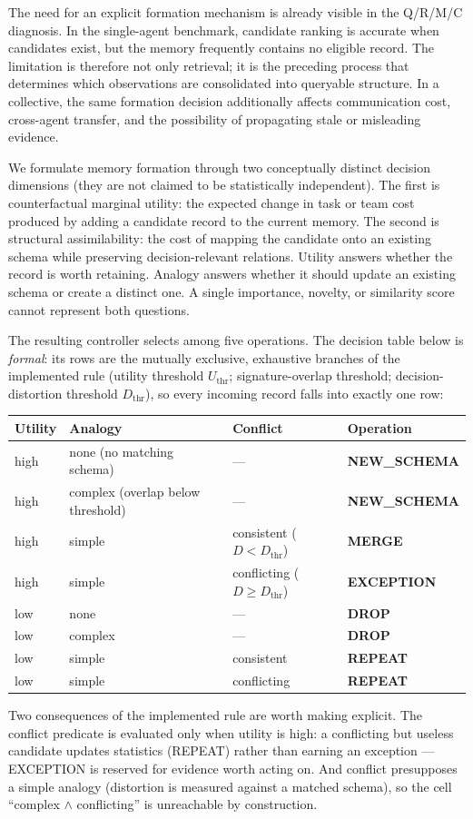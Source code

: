 \documentclass{article}
\begin{document}
The need for an explicit formation mechanism is already visible in the
Q/R/M/C diagnosis. In the single-agent benchmark, candidate ranking is
accurate when candidates exist, but the memory frequently contains no
eligible record. The limitation is therefore not only retrieval; it
is the preceding process that determines which observations are
consolidated into queryable structure. In a collective, the same
formation decision additionally affects communication cost,
cross-agent transfer, and the possibility of propagating stale or
misleading evidence.

We formulate memory formation through two conceptually distinct decision dimensions (they are not claimed to be statistically independent). The first
is counterfactual marginal utility: the expected change in task or
team cost produced by adding a candidate record to the current memory.
The second is structural assimilability: the cost of mapping the
candidate onto an existing schema while preserving decision-relevant
relations. Utility answers whether the record is worth retaining.
Analogy answers whether it should update an existing schema or create
a distinct one. A single importance, novelty, or similarity score
cannot represent both questions.

The resulting controller selects among five operations. The decision
table below is \emph{formal}: its rows are the mutually exclusive,
exhaustive branches of the implemented rule (utility threshold
$U_{\mathrm{thr}}$; signature-overlap threshold; decision-distortion
threshold $D_{\mathrm{thr}}$), so every incoming record falls into
exactly one row:
\begin{center}
\small
\begin{tabular}{llll}
\toprule
Utility & Analogy & Conflict & Operation \\
\midrule
high & none (no matching schema) & --- & \textbf{NEW\_SCHEMA} \\
high & complex (overlap below threshold) & --- & \textbf{NEW\_SCHEMA} \\
high & simple & consistent ($D{<}D_{\mathrm{thr}}$) & \textbf{MERGE} \\
high & simple & conflicting ($D{\ge}D_{\mathrm{thr}}$) & \textbf{EXCEPTION} \\
low & none & --- & \textbf{DROP} \\
low & complex & --- & \textbf{DROP} \\
low & simple & consistent & \textbf{REPEAT} \\
low & simple & conflicting & \textbf{REPEAT} \\
\bottomrule
\end{tabular}
\end{center}
Two consequences of the implemented rule are worth making explicit.
The conflict predicate is evaluated only when utility is high: a
conflicting but useless candidate updates statistics (REPEAT) rather
than earning an exception --- EXCEPTION is reserved for evidence worth
acting on. And conflict presupposes a simple analogy (distortion is
measured against a matched schema), so the cell
``complex $\wedge$ conflicting'' is unreachable by construction.
\end{document}
